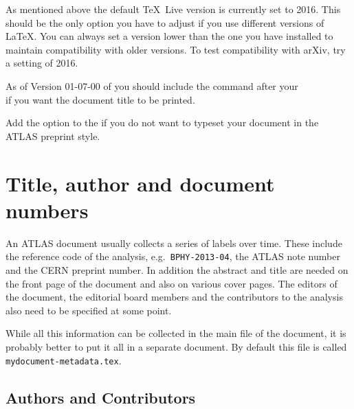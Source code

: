As mentioned above the default \TeX\ Live version is currently set to 2016.
This should be the only option you have to adjust if you use different versions of \LaTeX.
You can always set a version lower than the one you have installed to maintain compatibility with older versions.
To test compatibility with arXiv, try a setting of 2016.

As of Version 01-07-00 of  you should include the command  after your\\
\verb|| if you want the document title to be printed.

Add the option  to the  if you do not want to typeset your document in the ATLAS preprint style.


\section{Title, author and document numbers}
\label{sec:metadata}

An ATLAS document usually collects a series of labels over time.
These include the reference code of the analysis, e.g.\ \texttt{BPHY-2013-04}, 
the ATLAS note number and the CERN preprint number.
In addition the abstract and title are needed on the front page of the document and also on various cover pages.
The editors of the document, the editorial board members and the contributors to the analysis
also need to be specified at some point.

While all this information can be collected in the main file of the document, 
it is probably better to put it all in a separate document.
By default this file is called \texttt{mydocument-metadata.tex}.


\subsection{Authors and Contributors}
\label{sec:contribute}


